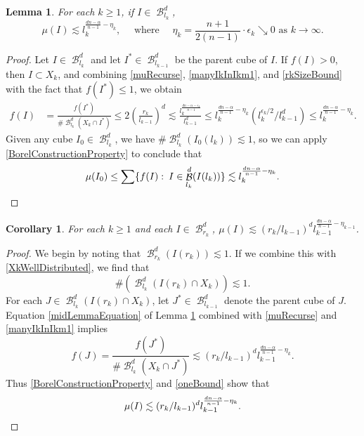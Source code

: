 \documentclass[dvipsnames,letterpaper,12pt]{article}
\numberwithin{equation}{section}
\theoremstyle{plain}
\newtheorem{lemma}{Lemma}
\newtheorem{corollary}{Corollary}
\theoremstyle{remark}
\DeclareMathOperator{\setcolon}{\colon}
\DeclareMathOperator{\B}{\mathcal{B}}
\begin{document}
\begin{lemma}\label{massSomeScales}
	For each $k \geq 1$, if $I \in \B^d_{l_k}$,
	\[ \mu(I) \lesssim l_k^{\frac{dn-\alpha}{n-1}- \eta_k}, \quad \text{ where } \quad \eta_k = \frac{n+1}{2(n-1)} \cdot \epsilon_k \searrow 0 \text{ as } k \rightarrow \infty. \]
\end{lemma}
\begin{proof}
	Let $I \in \B^d_{l_k}$ and let $I^* \in \B^d_{l_{k-1}}$ be the parent cube of $I$. If $f(I) > 0$, then $I \subset X_k$, and combining \eqref{muRecurse}, \eqref{manyIkInIkm1}, and \eqref{rkSizeBound} with the fact that $f(I^*) \leq 1$, we obtain
	\begin{equation} \label{midLemmaEquation}
	\begin{split}
		f(I) &= \frac{f(I^*)}{\# \B^d_{l_k}(X_k \cap I^*)} \leq 2 \left( \frac{r_k}{l_{k-1}} \right)^d \lesssim \frac{l_k^{\frac{dn - \alpha - \epsilon_k}{n-1}}}{l_{k-1}^d} \leq l_k^{\frac{dn - \alpha}{n-1} - \eta_k} (l_k^{\epsilon_k/2} / l_{k-1}^d) \leq l_k^{\frac{dn - \alpha}{n-1} - \eta_k}.
	\end{split}
	\end{equation}
	Given any cube $I_0 \in \B^d_{l_k}$, we have $\# \B^d_{l_k}(I_0(l_k)) \lesssim 1$, so we can apply \eqref{BorelConstructionProperty} to conclude that
	\[ \mu(I_0) \leq \sum \{ f(I) \setcolon I \in \B^d_{l_k}(I(l_k)) \} \lesssim l_k^{\frac{dn - \alpha}{n-1} - \eta_k}. \qedhere \]
\end{proof}

\begin{corollary}\label{muAtScaleRk}
	For each $k \geq 1$ and each $I \in \B^d_{r_k}$, $\mu(I) \lesssim (r_k/l_{k-1})^d l_{k-1}^{\frac{dn-\alpha}{n-1}-\eta_{k-1}}$.
\end{corollary}
\begin{proof}
	We begin by noting that $\B^d_{r_k}(I(r_k)) \lesssim 1$. If we combine this with \eqref{XkWellDistributed}, we find that
	\begin{equation} \label{oneBound}
		\#(\B^d_{l_k}(I(r_k) \cap X_k)) \lesssim 1.
	\end{equation}
	For each $J \in \B^d_{l_k}(I(r_k) \cap X_k)$, let $J^* \in \B^d_{l_{k-1}}$ denote the parent cube of $J$. Equation \eqref{midLemmaEquation} of Lemma \ref{massSomeScales} combined with \eqref{muRecurse} and \eqref{manyIkInIkm1} implies
	\[ f(J) = \frac{f(J^*)}{\# \B_{l_k}^d(X_k \cap J^*)} \lesssim (r_k/l_{k-1})^d l_{k-1}^{\frac{dn - \alpha}{n-1} - \eta_k}. \]
	Thus \eqref{BorelConstructionProperty} and \eqref{oneBound} show that
	\[ \mu(I) \lesssim (r_k/l_{k-1})^d l_{k-1}^{\frac{dn - \alpha}{n-1} - \eta_k}. \qedhere \]
\end{proof}
\end{document}
